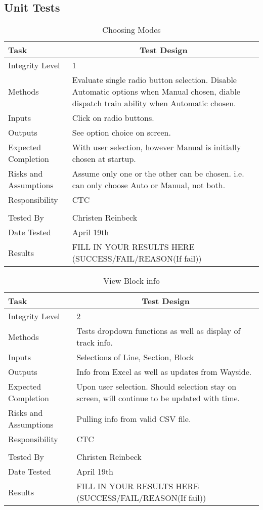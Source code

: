 \documentclass[]{article}
\begin{document}
\subsection{Unit Tests}
\begin{table}[H]
	\centering
	\caption{Choosing Modes}
	\begin{tabular}{|l|l|}
		\hline
		Task & \multicolumn{1}{c|}{Test Design} \\ \hline
		Integrity Level & 1 \\ \hline
		Methods & \parbox[t]{10cm}{Evaluate single radio button selection. Disable Automatic options when Manual chosen, diable dispatch train ability when Automatic chosen.}\\ \hline
		Inputs &  Click on radio buttons. \\ \hline
		Outputs &  See option choice on screen.\\ \hline
		Expected Completion & \parbox[t]{10cm}{With user selection, however Manual is initially chosen at startup.}\\ \hline
		Risks and Assumptions & \parbox[t]{10cm}{Assume only one or the other can be chosen. i.e. can only choose Auto or Manual, not both.} \\ \hline
		Responsibility & CTC\\ \hline
		\\ \hline
		Tested By   &  Christen Reinbeck\\	\hline
		Date Tested & \parbox[t]{10cm}{April 19th}\\ \hline
		Results & FILL IN YOUR RESULTS HERE (SUCCESS/FAIL/REASON(If fail))\\ \hline
	\end{tabular}
\end{table}

\begin{table}[H]
	\centering
	\caption{View Block info}
	\begin{tabular}{|l|l|}
		\hline
		Task & \multicolumn{1}{c|}{Test Design} \\ \hline
		Integrity Level & 2 \\ \hline
		Methods & Tests dropdown functions as well as display of track info.\\ \hline
		Inputs &  Selections of Line, Section, Block \\ \hline
		Outputs &  Info from Excel as well as updates from Wayside.\\ \hline
		Expected Completion & \parbox[t]{10cm}{Upon user selection. Should selection stay on screen, will continue to be updated with time.}\\ \hline
		Risks and Assumptions & \parbox[t]{10cm}{Pulling info from valid CSV file.} \\ \hline
		Responsibility & CTC\\ \hline
		\\ \hline
		Tested By   &  Christen Reinbeck\\	\hline
		Date Tested & \parbox[t]{10cm}{April 19th}\\ \hline
		Results & FILL IN YOUR RESULTS HERE (SUCCESS/FAIL/REASON(If fail))\\ \hline
	\end{tabular}
\end{table}
\end{document}
